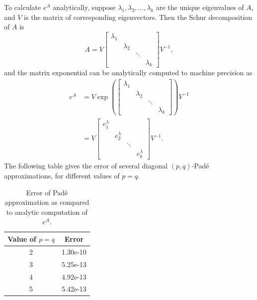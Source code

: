 \documentclass{csri19}
\begin{document}
To calculate $e^A$ analytically, suppose $\lambda_1, \lambda_2, \dots, 
\lambda_k$ are the unique eigenvalues of $A$, and $V$ is the matrix of 
corresponding eigenvectors. Then the Schur decomposition of $A$ is 
\[A = V \begin{bmatrix} \lambda_1 &           &        &           \\
                                  & \lambda_2 &        &           \\
                                  &           & \ddots &           \\
                                  &           &        & \lambda_k \end{bmatrix}
 V^{-1},\] and the matrix exponential can be analytically computed to 
machine precision as
\begin{align*}
e^A &= V \exp\left(\begin{bmatrix} \lambda_1 &           &        &           \\
                                             & \lambda_2 &        &           \\
                                             &           & \ddots &           \\
                                             &           &        & \lambda_k \end{bmatrix}\right) V^{-1} \\
  &= V \begin{bmatrix} e^\lambda_1 &             &        &             \\
                                   & e^\lambda_2 &        &             \\
                                   &             & \ddots &             \\
                                   &             &        & e^\lambda_k \end{bmatrix} V^{-1}.
\end{align*}
The following table gives the error of several diagonal $(p,q)$-Pad\'e approximations, for 
different values of $p=q$.
\begin{table}[ht]
  \begin{center}
    \caption{Error of Pad\'e approximation as compared to analytic 
               computation of $e^A$.}
    \label{CFK:tab:PadeError}
    \begin{tabular}{|c|c|}
      \hline
      \textbf{Value of $p=q$} & \textbf{Error}\\
      \hline
      2 & 1.30e-10 \\
      3 & 5.25e-13 \\
      4 & 4.92e-13 \\
      5 & 5.42e-13 \\
      \hline
    \end{tabular}
  \end{center}
\end{table}
\end{document}
